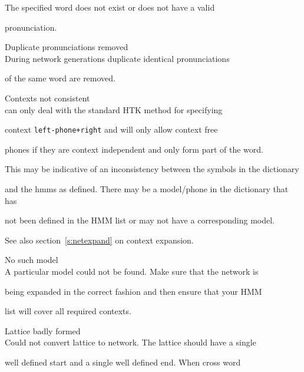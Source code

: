 \begin{itemize}
\begin{itemize}
        The specified word does not exist or does not have a valid 


        pronunciation.





    Duplicate pronunciations removed\\


        During network generations duplicate identical pronunciations


        of the same word are removed.





    Contexts not consistent\\


         can only deal with the standard HTK method for specifying


        context \texttt{left-phone+right} and will only allow context free 


        phones if they are context independent and only form part of the word.


        This may be indicative of an inconsistency between the symbols in the dictionary


        and the hmms as defined. There may be a model/phone in the dictionary that has 


        not been defined in the HMM list or may not have a corresponding model.


        See also section~\ref{s:netexpand}  on context expansion.








    No such model\\


        A particular model could not be found.  Make sure that the network is


        being expanded in the correct fashion and then ensure that your HMM


        list will cover all required contexts.





    Lattice badly formed\\


        Could not convert lattice to network.  The lattice should have a single


        well defined start and a single well defined end.  When cross word 



\end{itemize}
\end{itemize}
